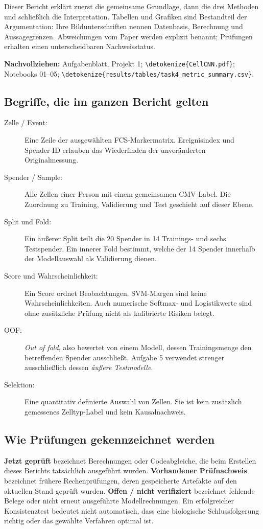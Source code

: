 \documentclass[11pt,a4paper]{article}
\newcommand{\code}[1]{\expandafter\nolinkurl\expandafter{\detokenize{#1}}}
\newcommand{\source}[1]{\par{\footnotesize\raggedright\color{muted}\textbf{Nachvollziehen:} #1\par}}
\begin{document}
Dieser Bericht erklärt zuerst die gemeinsame Grundlage, dann die drei
Methoden und schließlich die Interpretation. Tabellen und Grafiken sind
Bestandteil der Argumentation: Ihre Bildunterschriften nennen Datenbasis,
Berechnung und Aussagegrenzen. Abweichungen vom Paper werden explizit
benannt; Prüfungen erhalten einen unterscheidbaren Nachweisstatus.
\source{Aufgabenblatt, Projekt 1; \code{CellCNN.pdf}; Notebooks 01--05;
\code{results/tables/task4_metric_summary.csv}.}

\clearpage
\begingroup\small
\setlength{\parskip}{3pt}
\tableofcontents
\vspace{4mm}
\subsection*{Begriffe, die im ganzen Bericht gelten}
\begin{description}
\item[Zelle / Event:] Eine Zeile der ausgewählten FCS-Markermatrix. Ereignisindex
und Spender-ID erlauben das Wiederfinden der unveränderten Originalmessung.
\item[Spender / Sample:] Alle Zellen einer Person mit einem gemeinsamen CMV-Label.
Die Zuordnung zu Training, Validierung und Test geschieht auf dieser Ebene.
\item[Split und Fold:] Ein äußerer Split teilt die 20 Spender in 14 Trainings-
und sechs Testspender. Ein innerer Fold bestimmt, welche der 14 Spender
innerhalb der Modellauswahl als Validierung dienen.
\item[Score und Wahrscheinlichkeit:] Ein Score ordnet Beobachtungen.
SVM-Margen sind keine Wahrscheinlichkeiten. Auch numerische Softmax- und
Logistikwerte sind ohne zusätzliche Prüfung nicht als kalibrierte Risiken belegt.
\item[OOF:] \emph{Out of fold}, also bewertet von einem Modell, dessen
Trainingsmenge den betreffenden Spender ausschließt. Aufgabe 5 verwendet
strenger ausschließlich dessen \emph{äußere Testmodelle}.
\item[Selektion:] Eine quantitativ definierte Auswahl von Zellen. Sie ist
kein zusätzlich gemessenes Zelltyp-Label und kein Kausalnachweis.
\end{description}
\subsection*{Wie Prüfungen gekennzeichnet werden}
\textbf{Jetzt geprüft} bezeichnet Berechnungen oder Codeabgleiche, die beim
Erstellen dieses Berichts tatsächlich ausgeführt wurden. \textbf{Vorhandener
Prüfnachweis} bezeichnet frühere Rechenprüfungen, deren gespeicherte Artefakte
auf den aktuellen Stand geprüft wurden. \textbf{Offen / nicht verifiziert}
bezeichnet fehlende Belege oder nicht erneut ausgeführte Modellrechnungen.
Ein erfolgreicher Konsistenztest bedeutet nicht automatisch, dass eine
biologische Schlussfolgerung richtig oder das gewählte Verfahren optimal ist.
\endgroup
\end{document}

